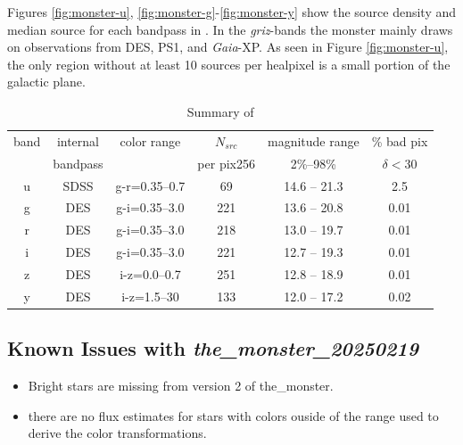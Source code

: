 Figures \ref{fig:monster-u}, \ref{fig:monster-g}-\ref{fig:monster-y} show the source density and median source for each bandpass in \monster.
In the \emph{griz}-bands the monster mainly draws on observations from DES, PS1, and \emph{Gaia}-XP.
As seen in Figure \ref{fig:monster-u}, the only region without at least 10 sources per healpixel is a small portion of the galactic plane. 

\begin{table}[htbp]
    \centering
    \label{tab:summary}
    
    \begin{tabular}{|c | c | c | c | c | c |}
        \hline
        band & internal & color range & $N_{src}$  & magnitude range & \% bad pix\\
             & bandpass &             & per pix256 &  2\%--98\%         &$\delta < 30$\\
        \hline
        u             &  SDSS                      & g-r=0.35--0.7        & 69                      & 14.6 -- 21.3   &  2.5  \\
        g             & DES                        & g-i=0.35--3.0        & 221                     & 13.6 -- 20.8   &  0.01 \\
        r             & DES                        & g-i=0.35--3.0        & 218                     & 13.0 -- 19.7   &  0.01 \\
        i             & DES                        & g-i=0.35--3.0        & 221                     & 12.7 -- 19.3   &  0.01 \\
        z             & DES                        & i-z=0.0--0.7         & 251                     & 12.8 -- 18.9   &  0.01 \\
        y             & DES                        & i-z=1.5--30          & 133                     & 12.0 -- 17.2   &  0.02 \\
        \hline
    \end{tabular}
    \caption{Summary of \monster}
\end{table}



\newpage

\subsection{Known Issues with \emph{the\_monster\_20250219}}
\begin{itemize}
    \item Bright stars are missing from version 2 of the\_monster.
    \item there are no flux estimates for stars with colors ouside of the range used to derive the color transformations.
\end{itemize}

